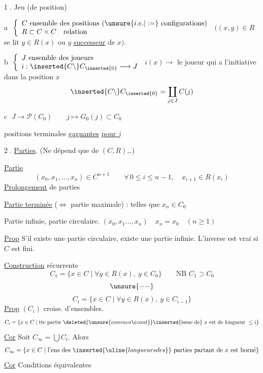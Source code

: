 \textcircled{1.} Jeu (de position)

\textcircled{a} $\left\{\begin{array}{l} C\text{ ensemble des positions }(\unsure{i.e.|:=}\text{ configurations})\\ R\subset C\times C\quad\text{relation}\end{array}\right.$
$((x,y)\in R$ se lit $y\in R(x)$ ou $y$ \uline{successeur} de $x)$.


\textcircled{b} $\left\{\begin{array}{l}J\text{ ensemble des joueurs}\\ i:\inserted{C\setminus}C_{\inserted{0}}\longrightarrow J\end{array}\right.$
$i(x)\longrightarrow$ le joueur qui a l'initiative dans la position $x$
\[
\inserted{C\setminus}C_{\inserted{0}}=\coprod_{j\in J}C(j)
\]

\textcircled{c} $J\longrightarrow\mathcal P(C_0)\qquad j\longmapsto G_0(j)\subset C_0$
\begin{center}positions terminales \uline{gagnantes} \uline{pour $j$}\end{center}

\textcircled{2.} \uline{Parties}.
 (Ne dépend que de $(C,R)$\ldots)

\uline{Partie} 
\[
(x_0,x_1,\ldots,x_n)\in C^{n+1}\qquad \forall\,0\leq i\leq n-1,\quad x_{i+1}\in R(x_i)
\]
\uline{Prolongement} de parties

\uline{Partie terminée} ($\Leftrightarrow$ partie maximale) : telles que $x_n\in C_0$

Partie infinie, partie circulaire. $(x_0,x_1\ldots,x_n)\quad x_n=x_0\quad(n\geq1)$

\uline{Prop} S'il existe une partie circulaire, existe une partie infinie. L'inverse est vrai si $C$ est fini.

\uline{Construction} récurrente
\inserted{\[
C_{-1}=\varnothing\qquad C_0=\{x\in C\mid\forall y\in R(x),\ y\in C_{-1}\}=\{x\in C\mid R(x)=\varnothing\}
\]}
\[
C_1=\{x\in C\mid\forall y\in R(x),\ y\in C_0\}\qquad\text{NB }C_1\supset C_0
\]
\[
\unsure{--}
\]
\[
C_i=\{x\in C\mid\forall y\in R(x),\ y\in C_{i-1}\}
\]
\uline{Prop} $(C_i)$   croiss. d'ensembles.
\[
C_i=\{x\in C\mid\text{tte partie }\deleted{\unsure{commençant}}\inserted{\text{issue de}}\ x\text{ est de longueur }\leq i\}
\]
\uline{Cor} Soit $C_\infty=\bigcup C_i$. Alors
\[
C_\infty=\{x\in C\mid\text{l'ens des }\inserted{\uline{longueurs des}}\text{ parties partant de }x\text{ est borné}\}
\]
\uline{Cor} Conditions équivalentes

